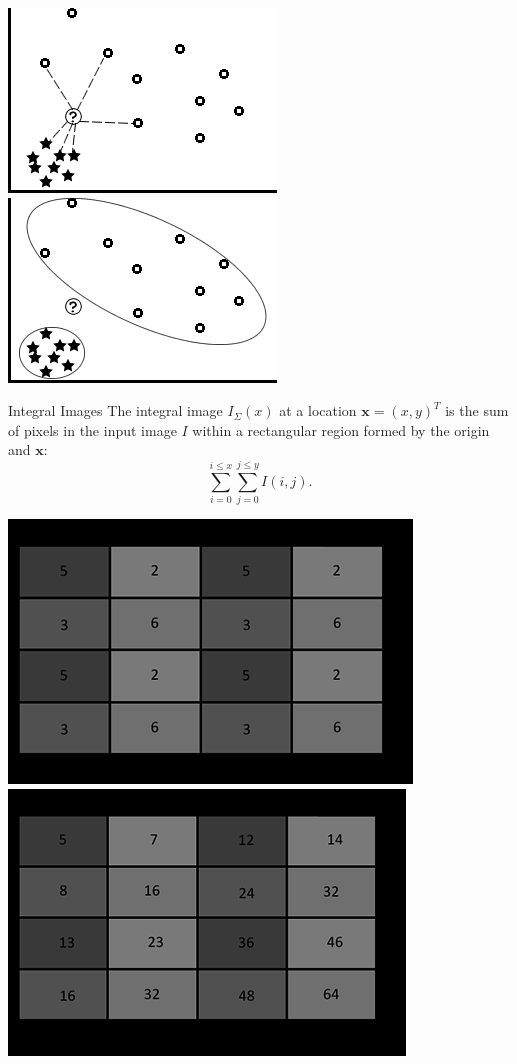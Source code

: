 \documentclass[xcolor=dvipsnames]{beamer}
\begin{document}
\begin{frame}
\begin{center}
 \includegraphics[width=.5\textwidth]{imgs/ex_euc_dist-fw.png}
 \includegraphics[width=.5\textwidth]{imgs/ex_mah_dist-fw.png}
\end{center}
\end{frame}

\begin{frame}[label=math-integral]{Integral Images}
 The integral image $I_\Sigma(x)$ at a location $\mathbf{x} = (x, y)^T$ is the sum of pixels in the input image $I$ within a rectangular region formed by the origin and $\mathbf{x}$:
 \begin{equation} \label{eq:integral}
  \sum_{i=0}^{i\leq x} \sum_{j=0}^{j\leq y} I(i,j).
 \end{equation}
\end{frame}

\begin{frame}
 \begin{center}
 \includegraphics[width=.45\textwidth]{imgs/ii-orig.png}
 \includegraphics[width=.45\textwidth]{imgs/ii-sum.png}
 \end{center}
\end{frame}
\end{document}
